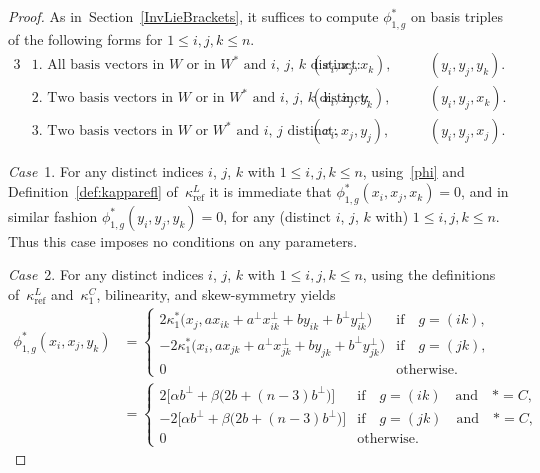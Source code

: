 \documentclass[pdftex]{sigma}
\numberwithin{equation}{section}
\DeclareMathOperator{\refl}{ref}
\begin{document}
\begin{proof}
As in~Section~\ref{InvLieBrackets}, it suffices to compute $\phi^*_{1,g}$ on basis triples
of the following forms for $1 \leq i, j, k \leq n$.
\begin{alignat*}{3}
&\text{1.\ All basis vectors in $W$ or in $W^*$ and $i$, $j$, $k$ distinct:} &\hspace{10pt}
& (x_i,x_j,x_k), & &\quad (y_i,y_j,y_k). \\
&\text{2.\ Two basis vectors in $W$ or in $W^*$ and $i$, $j$, $k$ distinct:} &\hspace{10pt}
& (x_i,x_j,y_k), & &\quad (y_i,y_j,x_k). \\
&\text{3.\ Two basis vectors in $W$ or $W^*$ and $i$, $j$ distinct:} &\hspace{10pt}
& (x_i,x_j,y_j), & &\quad (y_i,y_j,x_j).
\end{alignat*}

\textit{Case}~1.
For any distinct indices $i$, $j$, $k$ with $1 \leq i, j, k \leq n$, using~\eqref{phi} and
Definition~\ref{def:kapparefl} of~$\kappa^L_{\refl}$ it is immediate
that $\phi^*_{1,g}(x_i,x_j,x_k)=0$, and in similar fashion $\phi^*_{1,g}(y_i,y_j,y_k)=0$,
for any (distinct $i$, $j$, $k$ with) $1 \leq i, j, k \leq n$.
Thus this case imposes no conditions on any parameters.

\textit{Case}~2.
For any distinct indices $i$, $j$, $k$ with $1 \leq i, j, k \leq n$,
using the definitions of~$\kappa^L_{\refl}$ and~$\kappa^C_1$, bilinearity,
and skew-symmetry yields
\begin{align*}
\phi^*_{1,g}(x_i,x_j,y_k)%
&=\begin{cases}
2\kappa^*_1\big(x_j,ax_{ik}+a^\perp x_{ik}^\perp + b y_{ik} + b^\perp y_{ik}^\perp\big) &\text{if}\quad g=(ik),
\\
-2\kappa^*_1\big(x_i,ax_{jk}+a^\perp x_{jk}^\perp + b y_{jk} + b^\perp y_{jk}^\perp\big) &\text{if}\quad g=(jk), \\
0 & \text{otherwise}.
\end{cases}
\\
&=\begin{cases}
2\big[\alpha b^\perp + \beta\big(2b+(n-3)b^\perp\big)\big] & \text{if}\quad g=(ik)\quad \text{and}\quad *=C, \\
-2\big[\alpha b^\perp + \beta\big(2b+(n-3)b^\perp\big)\big] &\text{if}\quad g=(jk) \quad \text{and}\quad *=C, \\
 0 & \text{otherwise}.
\end{cases}
\end{align*}


\end{proof}
\end{document}
